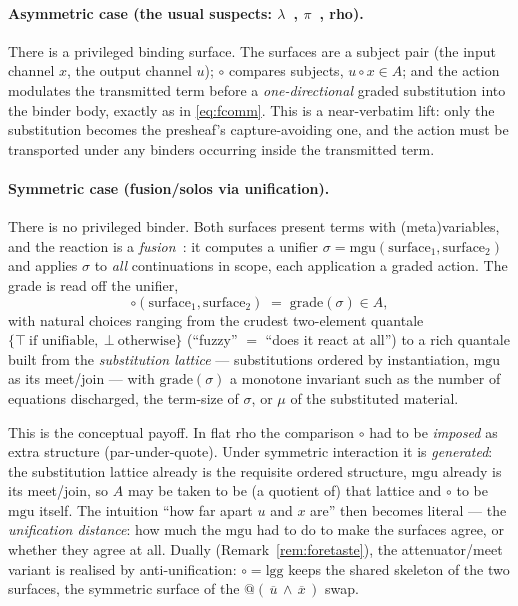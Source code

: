 \documentclass[11pt]{article}
\makeatletter
\theoremstyle{plain}
\theoremstyle{definition}
\theoremstyle{remark}
\newcommand{\quo}[1]{@#1}
\newcommand{\dr}[1]{\,\overline{#1}\,}   %
\newcommand{\cmp}{\mathbin{\circ}}       %
\newcommand{\meas}{\mu}
\newcommand{\mgu}{\mathrm{mgu}}
\newcommand{\lgg}{\mathrm{lgg}}
\makeatother
\begin{document}
\paragraph{Asymmetric case (the usual suspects: $\lambda$~\cite{barendregt}, $\pi$~\cite{mpw}, rho).}
There is a privileged binding surface. The surfaces are a subject pair (the input channel $x$, the output
channel $u$); $\cmp$ compares subjects, $u\cmp x\in A$; and the action modulates the transmitted term
before a \emph{one-directional} graded substitution into the binder body, exactly as in
\eqref{eq:fcomm}. This is a near-verbatim lift: only the substitution becomes the presheaf's
capture-avoiding one, and the action must be transported under any binders occurring inside the
transmitted term.

\paragraph{Symmetric case (fusion/solos via unification).}
There is no privileged binder. Both surfaces present terms with (meta)variables, and the reaction is a
\emph{fusion}~\cite{parrowvictor,lanevevictor}: it computes a unifier $\sigma=\mgu(\text{surface}_1,\text{surface}_2)$ and applies $\sigma$
to \emph{all} continuations in scope, each application a graded action. The grade is read off the
unifier,
\[
\cmp(\text{surface}_1,\text{surface}_2)\;=\;\mathrm{grade}(\sigma)\in A,
\]
with natural choices ranging from the crudest two-element quantale
$\{\top\ \text{if unifiable},\ \bot\ \text{otherwise}\}$ (``fuzzy'' $=$ ``does it react at all'') to a
rich quantale built from the \emph{substitution lattice} --- substitutions ordered by instantiation,
$\mgu$ as its meet/join --- with $\mathrm{grade}(\sigma)$ a monotone invariant such as the number of
equations discharged, the term-size of $\sigma$, or $\meas$ of the substituted material.

\medskip\noindent This is the conceptual payoff. In flat rho the comparison $\cmp$ had to be
\emph{imposed} as extra structure (par-under-quote). Under symmetric interaction it is
\emph{generated}: the substitution lattice already is the requisite ordered structure, $\mgu$ already
is its meet/join, so $A$ may be taken to be (a quotient of) that lattice and $\cmp$ to be $\mgu$
itself. The intuition ``how far apart $u$ and $x$ are'' then becomes literal --- the
\emph{unification distance}: how much the $\mgu$ had to do to make the surfaces agree, or whether they
agree at all. Dually (Remark~\ref{rem:foretaste}), the attenuator/meet variant is realised by
anti-unification: $\cmp=\lgg$ keeps the shared skeleton of the two surfaces, the symmetric surface of the
$\quo{(\dr u\wedge \dr x)}$ swap.
\end{document}
